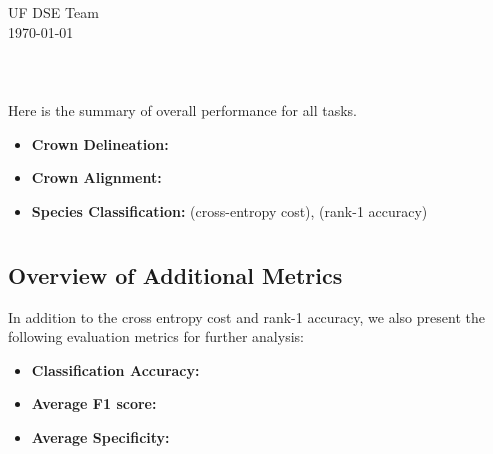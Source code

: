 \documentclass[]{report}   %
\begin{document}

\section*{{\color{blue}{\huge NEON NIST Data Science Evaluation\\ Report for }}}
{\large UF DSE Team}
\\
{\large \today}
\\\\
\section*{\color{blue}{Overall Performance}}
Here is the summary of overall performance for all tasks.
\begin{itemize} 
   \item[\checkmark] \textbf{Crown Delineation:} 
   \item[\checkmark] \textbf{Crown Alignment:} 
   \item[\checkmark] \textbf{Species Classification:} (cross-entropy cost), (rank-1 accuracy)
\end{itemize}








\newpage
\section*{\color{blue}{Task 3 - Species Classification}}
\subsection*{Overview of Additional Metrics}
In addition to the cross entropy cost and rank-1 accuracy, we also present the following evaluation metrics for further analysis:
\begin{itemize}
\item[] \textbf{Classification Accuracy:} 
\item[] \textbf{Average F1 score:} 
\item[] \textbf{Average Specificity:} 
\end{itemize}
\end{document}
